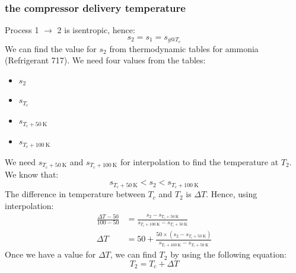 \documentclass[12pt]{article}
\numberwithin{equation}{section}
\begin{document}
\begin{flushleft}
\subsubsection[Compressor delivery temperature.]{the compressor delivery temperature}
Process 1 $\rightarrow$ 2 is isentropic, hence:
\begin{equation}
  s_2 = s_1 = s_{g@T_e}
\end{equation}
We can find the value for $s_2$ from thermodynamic tables for ammonia (Refrigerant 717). We need four values from the tables:
\begin{multicols}{2}
  \begin{itemize}
    \item $s_2$
    \item $s_{T_c}$
    \item $s_{T_c + 50 \ \si{\kelvin}}$
    \item $s_{T_c + 100 \ \si{\kelvin}}$
  \end{itemize}
\end{multicols}
We need $s_{T_c + 50 \ \si{\kelvin}}$ and $s_{T_c + 100 \ \si{\kelvin}}$ for interpolation to find the temperature at $T_2$. We know that:
\begin{equation}
  s_{T_c + 50 \ \si{\kelvin}} < s_2 < s_{T_c + 100 \ \si{\kelvin}}
\end{equation}
The difference in temperature between $T_c$ and $T_2$ is $\Delta T$. Hence, using interpolation:
\begin{align}
  \frac{\Delta T - 50}{100 -50} &= \frac{s_2 - s_{T_c + 50 \ \si{\kelvin}}}{s_{T_c + 100 \ \si{\kelvin}} - s_{T_c + 50 \ \si{\kelvin}}}\\
  \Delta T &= 50 + \frac{50 \times (s_2 - s_{T_c + 50 \ \si{\kelvin}})}{s_{T_c + 100 \ \si{\kelvin}} - s_{T_c + 50 \ \si{\kelvin}}}
\end{align}
Once we have a value for $\Delta T$, we can find $T_2$ by using the following equation:
\begin{equation}
  T_2 = T_c + \Delta T
\end{equation}

\end{flushleft}
\end{document}
